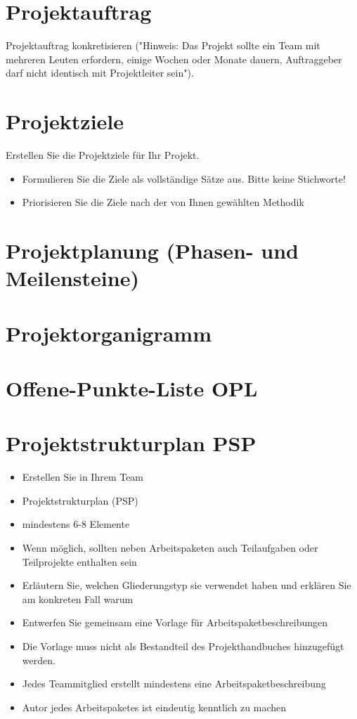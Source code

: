 \documentclass[12pt]{article}
\begin{document}
\section{Projektauftrag}
Projektauftrag konkretisieren ("Hinweis: Das Projekt sollte ein Team mit mehreren Leuten erfordern, einige Wochen oder
Monate dauern, Auftraggeber darf nicht identisch mit Projektleiter sein").


\section{Projektziele}
Erstellen Sie die Projektziele für Ihr Projekt.
\begin{itemize}
\item Formulieren Sie die Ziele als vollständige Sätze aus. Bitte keine Stichworte!
\item Priorisieren Sie die Ziele nach der von Ihnen gewählten Methodik
\end{itemize}

\section{Projektplanung (Phasen- und Meilensteine)}

\section{Projektorganigramm}

\section{Offene-Punkte-Liste OPL}

\section{Projektstrukturplan PSP}
\begin{itemize}
	\item Erstellen Sie in Ihrem Team
	\item Projektstrukturplan (PSP)
	\item mindestens 6-8 Elemente
	\item Wenn möglich, sollten neben Arbeitspaketen auch Teilaufgaben oder Teilprojekte enthalten sein
	\item Erläutern Sie, welchen Gliederungstyp sie verwendet haben und erklären Sie am konkreten Fall warum
	\item Entwerfen Sie gemeinsam eine Vorlage für Arbeitspaketbeschreibungen
	\item Die Vorlage muss nicht als Bestandteil des Projekthandbuches hinzugefügt werden.
	\item Jedes Teammitglied erstellt mindestens eine Arbeitspaketbeschreibung
	\item Autor jedes Arbeitspaketes ist eindeutig kenntlich zu machen
\end{itemize}
\end{document}
